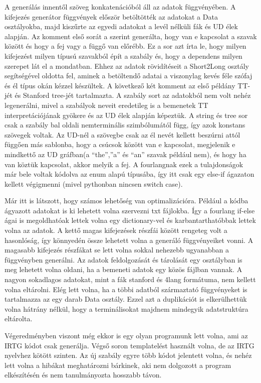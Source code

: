 A generálás innentől szöveg konkatenációból áll az adatok függvényében.
A kifejezés generátor függvények először betöltötték az adatokat a Data osztályokba, majd kiszűrte az egyedi adatokat a levél nélküli fák és UD élek alapján. Az komment első sorát a szerint generálta, hogy van e kapcsolat a szavak között és hogy a fej vagy a függő van előrébb. Ez a sor azt írta le, hogy milyen kifejezést milyen típusú szavakból épít a szabály és, hogy a dependens milyen szerepet lát el a mondatban. Ehhez az adatok rövidítéseit a Short2Long osztály segítségével oldotta fel, aminek a betöltendő adatai  a viszonylag kevés féle szófaj és él típus okán kézzel készültek. A következő két komment az első példány TT-jét és Stanford tree-jét tartalmazta. A szabály sort az adatokból nem volt nehéz legenerálni, mivel a szabályok neveit eredetileg is a bemenetek TT interpretációjának gyökere és az UD élek alapján képeztük. A string és tree sor csak a szabály bal oldali nemterminális szimbólumától függ, így azok konstans szövegek voltak. Az UD-nél a szövegbe csak az él nevét kellett beszúrni attól függően más sablonba, hogy a csúcsok között van e kapcsolat, megjelenik e mindkettő az UD gráfban(a “the”,”a” és “an” szavak például nem), és hogy ha van köztük kapcsolat, akkor melyik a fej. A fourlangnak ezek a tulajdonságok már bele voltak kódolva az enum alapú típusába, így itt csak egy else-if ágazaton kellett végigmenni (mivel pythonban nincsen switch case).

Már itt is látszott, hogy számos lehetőség van optimalizációra. Például a kódba ágyazott adatokat is ki lehetett volna szervezni txt fájlokba. Így a fourlang if-else ágai is megoldhatóak lettek volna egy dictionary-vel és karbantarthatóbbak lettek volna az adatok. A kettő magas kifejezések részfái között rengeteg volt a hasonlóság, így könnyedén össze lehetett volna a generáló függvényeiket vonni. A magasabb kifejezés részfákat se lett volna sokkal nehezebb ugyanabban a függvényben generálni. Az adatok feldolgozását és tárolását egy osztályban is meg lehetett volna oldani, ha a bemeneti adatok egy közös fájlban vannak. A nagyon sokadlagos adatokat, mint a fák stanford és 4lang formátuma, nem kellett volna eltárolni. Elég lett volna, ha a többi adatból származtató függvényeket is tartalmazza az egy darab Data osztály. Ezzel azt a duplikációt is elkerülhettük volna hátrány nélkül, hogy a terminálisokat majdnem mindegyik adatstruktúra eltárolta.

Végeredményben viszont még ekkor is egy olyan programunk lett volna, ami az IRTG kódot csak generálja. Végső soron templatelést használt volna, de az IRTG nyelvhez kötött szinten. Az új szabály egyre több kódot jelentett volna, és nehéz lett volna a hibákat meghatározni bárkinek, aki nem dolgozott a program elkészítésén és nem tanulmányozta hosszabb távon.


